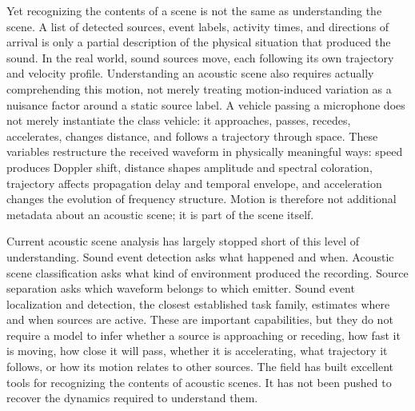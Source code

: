 \documentclass{article}
\begin{document}
Yet recognizing the contents of a scene is not the same as understanding the scene. A list of detected sources, event labels, activity times, and directions of arrival is only a partial description of the physical situation that produced the sound. In the real world, sound sources move, each following its own trajectory and velocity profile. Understanding an acoustic scene also requires actually comprehending this motion, not merely treating motion-induced variation as a nuisance factor around a static source label. A vehicle passing a microphone does not merely instantiate the class vehicle: it approaches, passes, recedes, accelerates, changes distance, and follows a trajectory through space. These variables restructure the received waveform in physically meaningful ways: speed produces Doppler shift, distance shapes amplitude and spectral coloration, trajectory affects propagation delay and temporal envelope, and acceleration changes the evolution of frequency structure. Motion is therefore not additional metadata about an acoustic scene; it is part of the scene itself.

Current acoustic scene analysis has largely stopped short of this level of understanding. Sound event detection asks what happened and when. Acoustic scene classification asks what kind of environment produced the recording. Source separation asks which waveform belongs to which emitter. Sound event localization and detection, the closest established task family, estimates where and when sources are active. These are important capabilities, but they do not require a model to infer whether a source is approaching or receding, how fast it is moving, how close it will pass, whether it is accelerating, what trajectory it follows, or how its motion relates to other sources. The field has built excellent tools for recognizing the contents of acoustic scenes. It has not been pushed to recover the dynamics required to understand them.
\end{document}
